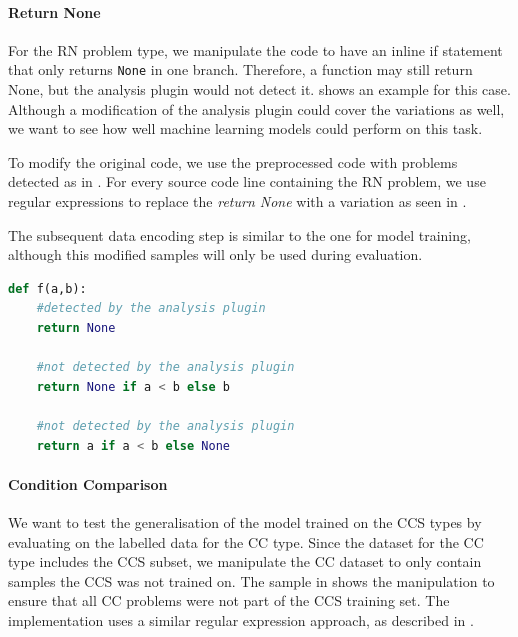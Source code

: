 \paragraph{Return None}\label{par:manipulation_return_none}
For the RN problem type, we manipulate the code to have an inline if statement that only returns \texttt{None} in one branch. Therefore, a function may still return None, but the analysis plugin would not detect it.  shows an example for this case. Although a modification of the analysis plugin could cover the variations as well, we want to see how well machine learning models could perform on this task.

To modify the original code, we use the preprocessed code with problems detected as in . For every source code line containing the RN problem, we use regular expressions to replace the \textit{return None} with a variation as seen in . 

The subsequent data encoding step is similar to the one for model training, although this modified samples will only be used during evaluation.

\begin{lstlisting}[float=t, language=Python, label=lst:return_none_modified, caption={Samples for returning None. The analysis plugin would flag the first return; the second and third return are modified variations that would be ignored by the analysis plugin. The performance of the machine learning models on detecting the latter will be evaluated.}]
def f(a,b):
    #detected by the analysis plugin
    return None 

    #not detected by the analysis plugin
    return None if a < b else b 

    #not detected by the analysis plugin
    return a if a < b else None \end{lstlisting}

    \paragraph{Condition Comparison}\label{par:manipulation_condition_comparison}
We want to test the generalisation of the model trained on the CCS types by evaluating on the labelled data for the CC type. 
Since the dataset for the CC type includes the CCS subset, we manipulate the CC dataset to only contain samples the CCS was not trained on. The sample in  shows the manipulation to ensure that all CC problems were not part of the CCS training set. The implementation uses a similar regular expression approach, as described in .

